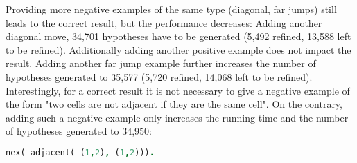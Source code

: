 Providing more negative examples of the same type (diagonal, far jumps) still leads to the correct result, but the performance decreases:
Adding another diagonal move, 34,701 hypotheses have to be generated (5,492 refined, 13,588 left to be refined). Additionally adding another positive example does not impact the result. 
Adding another far jump example further increases the number of hypotheses generated to 35,577 (5,720 refined, 14,068 left to be refined).\\
Interestingly, for a correct result it is not necessary to give a negative example of the form "two cells are not adjacent if they are the same cell". On the contrary, adding such a negative example only increases the running time and the number of hypotheses generated to 34,950:
\begin{lstlisting}[label={lst:adjacent_neg}, language=Prolog, caption=Negative example, belowcaptionskip=1cm]
nex( adjacent( (1,2), (1,2))).
\end{lstlisting}
